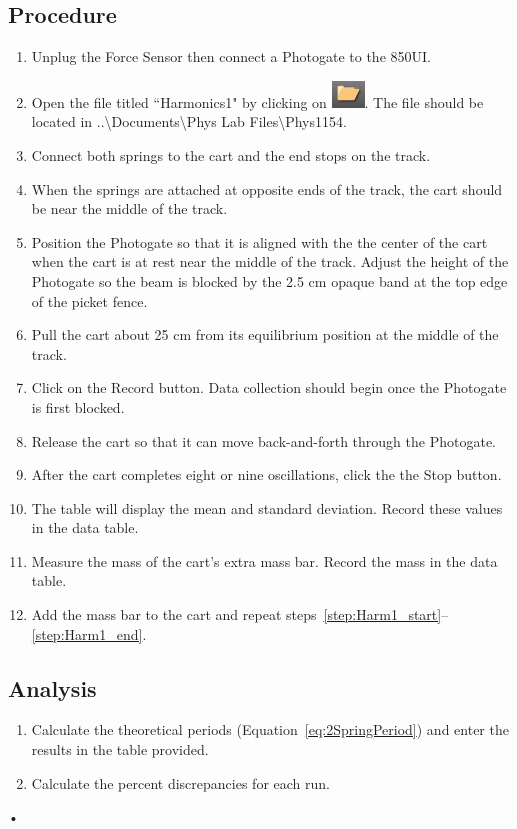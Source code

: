 \documentclass[main.tex]{subfiles}
\begin{document}
\subsection*{Procedure}
\begin{enumerate}
\item
Unplug the Force Sensor then connect a Photogate to the 850UI.
\item
Open the file titled ``Harmonics1" by clicking on \includegraphics{Open_Experiment}. The file should be located in ..\textbackslash Documents\textbackslash Phys Lab Files\textbackslash Phys1154.
\item
Connect both springs to the cart and the end stops on the track.
\item
When the springs are attached at opposite ends of the track, the cart should be near the middle of the track.
\item \label{step:Harm1_start}
Position the Photogate so that it is aligned with the the center of the cart when the cart is at rest near the middle of the track. Adjust the height of the Photogate so the beam is blocked by the 2.5 cm opaque band at the top edge of the picket fence.
\item
Pull the cart about 25 cm from its equilibrium position at the middle of the track.
\item
Click on the Record button. Data collection should begin once the Photogate is first blocked.
\item
Release the cart so that it can move back-and-forth through the Photogate.
\item
After the cart completes eight or nine oscillations, click the the Stop button.
\item
The table will display the mean and standard deviation. Record these values in the data table.
\item \label{step:Harm1_end}
Measure the mass of the cart's extra mass bar. Record the mass in the data table.
\item
Add the mass bar to the cart and repeat steps~\ref{step:Harm1_start}--\ref{step:Harm1_end}.
\end{enumerate}

\subsection*{Analysis}
\begin{enumerate}
\item
Calculate the theoretical periods (Equation~\eqref{eq:2SpringPeriod}) and enter the results in the table provided. 
\item
Calculate the percent discrepancies for each run.
\end{enumerate}•
\end{document}
